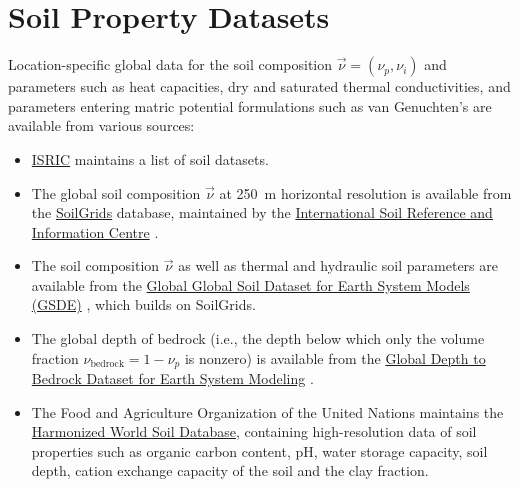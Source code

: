 \documentclass[twoside,10pt]{report}
\begin{document}


\section{Soil Property Datasets}\label{s:soil_data}

Location-specific global data for the soil composition $\vec{\nu} = (\nu_p, \nu_i)$ and parameters such as heat capacities, dry and saturated thermal conductivities, and parameters entering matric potential formulations such as van Genuchten's are available from various sources:
\begin{itemize}
    \item \href{https://www.isric.org/explore/soil-geographic-databases}{ISRIC} maintains a list of soil datasets. 
    \item The global soil composition $\vec{\nu}$ at 250~m horizontal resolution is available from the \href{https://www.isric.org/explore/soilgrids/}{SoilGrids} database, maintained by the \href{https://www.isric.org}{International Soil Reference and Information Centre} \citep{Hengl17a}.
    \item The soil composition $\vec{\nu}$ as well as thermal and hydraulic soil parameters are available from the \href{http://globalchange.bnu.edu.cn/research/soil5.jsp}{Global Global Soil Dataset for Earth System Models (GSDE)} \citep{Dai19a,Dai19b}, which builds on SoilGrids.
    \item The global depth of bedrock (i.e., the depth below which only the volume fraction $\nu_{\mathrm{bedrock}} = 1-\nu_p$ is nonzero) is available from the \href{http://globalchange.bnu.edu.cn/research/dtb.jsp}{Global Depth to Bedrock Dataset for Earth System Modeling} \citep{Shanggua17a}.
    \item The Food and Agriculture Organization of the United Nations maintains the \href{http://www.fao.org/soils-portal/soil-survey/soil-maps-and-databases/harmonized-world-soil-database-v12/en/}{Harmonized World Soil Database}, containing high-resolution data of soil properties such as organic carbon content, pH, water storage capacity, soil depth, cation exchange capacity of the soil and the clay fraction.
\end{itemize}
\end{document}
